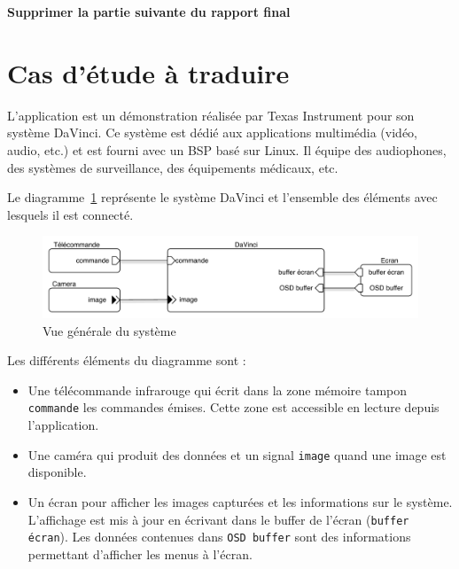 \documentclass[11pt, a4paper]{paper}
\begin{document}
\newpage
\appendix
{\color{red}
\begin{framed}
\begin{center}{\bf\Large Supprimer la partie suivante du rapport final } \end{center}
\end{framed}
}

\section{Cas d'étude à traduire}
\label{ann:conception}

L'application est un démonstration réalisée par Texas Instrument pour son système DaVinci. Ce système est dédié aux applications multimédia (vidéo, audio, etc.) et est fourni avec un BSP basé sur Linux. Il équipe des audiophones, des systèmes de surveillance, des équipements médicaux, etc.

Le diagramme~\ref{fig:vue_gen} représente le système DaVinci et l'ensemble des éléments avec lesquels il est connecté.

\begin{figure}[htp]
\begin{center}
\includegraphics[scale=.6]{figures-pdf/contexte.pdf}
\caption{Vue générale du système}
\label{fig:vue_gen}
\end{center}
\end{figure}


Les différents éléments du diagramme sont :
\begin{itemize}
\item Une télécommande infrarouge qui écrit dans la zone mémoire tampon {\tt commande} les commandes émises. Cette zone est accessible en lecture depuis l'application.
\item Une caméra qui produit des données et un signal {\tt image} quand une image est disponible.
\item Un écran pour afficher les images capturées et les informations sur le système. L'affichage est mis à jour en écrivant dans le buffer de l'écran ({\tt buffer écran}). Les données contenues dans {\tt OSD buffer} sont des informations permettant d'afficher les menus à l'écran.
\end{itemize}
\end{document}
